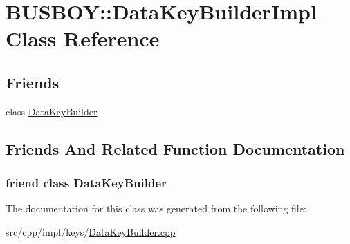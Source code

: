 \hypertarget{classBUSBOY_1_1DataKeyBuilderImpl}{
\section{BUSBOY::DataKeyBuilderImpl Class Reference}
\label{classBUSBOY_1_1DataKeyBuilderImpl}
}
\subsection*{Friends}
\begin{DoxyCompactItemize}
\item 
class \hyperlink{classBUSBOY_1_1DataKeyBuilderImpl_adb04bcf224c8c1e41069bfb7e0a3d5c5}{DataKeyBuilder}
\end{DoxyCompactItemize}


\subsection{Friends And Related Function Documentation}
\hypertarget{classBUSBOY_1_1DataKeyBuilderImpl_adb04bcf224c8c1e41069bfb7e0a3d5c5}{
\subsubsection[{DataKeyBuilder}]{\setlength{\rightskip}{0pt plus 5cm}friend class {\bf DataKeyBuilder}}}
\label{classBUSBOY_1_1DataKeyBuilderImpl_adb04bcf224c8c1e41069bfb7e0a3d5c5}


The documentation for this class was generated from the following file:\begin{DoxyCompactItemize}
\item 
src/cpp/impl/keys/\hyperlink{DataKeyBuilder_8cpp}{DataKeyBuilder.cpp}\end{DoxyCompactItemize}
